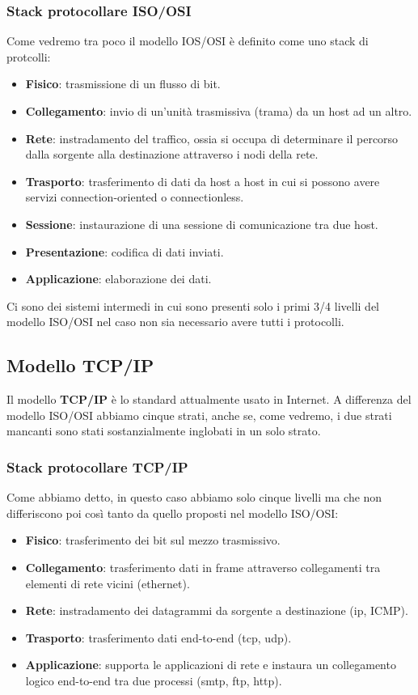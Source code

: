 \subsubsection{Stack protocollare ISO/OSI}
Come vedremo tra poco il modello IOS/OSI è definito come uno stack di protcolli:
\begin{itemize}
	\item \textbf{Fisico}: trasmissione di un flusso di bit.
	\item \textbf{Collegamento}: invio di un'unità trasmissiva (trama) da un host ad un altro.
	\item \textbf{Rete}: instradamento del traffico, ossia si occupa di determinare il percorso 
		dalla sorgente alla destinazione attraverso i nodi della rete.
	\item \textbf{Trasporto}: trasferimento di dati da host a host in cui si possono avere servizi
		connection-oriented o connectionless.
	\item \textbf{Sessione}: instaurazione di una sessione di comunicazione tra due host.
	\item \textbf{Presentazione}: codifica di dati inviati.
	\item \textbf{Applicazione}: elaborazione dei dati.
\end{itemize}
Ci sono dei sistemi intermedi in cui sono presenti solo i primi 3/4 livelli del modello ISO/OSI
nel caso non sia necessario avere tutti i protocolli.

\subsection{Modello TCP/IP}
Il modello \textbf{TCP/IP} è lo standard attualmente usato in Internet. A differenza del modello 
ISO/OSI abbiamo cinque strati, anche se, come vedremo, i due strati mancanti sono stati
sostanzialmente inglobati in un solo strato.

\subsubsection{Stack protocollare TCP/IP}
Come abbiamo detto, in questo caso abbiamo solo cinque livelli ma che non differiscono poi così 
tanto da quello proposti nel modello ISO/OSI:
\begin{itemize}
	\item \textbf{Fisico}: trasferimento dei bit sul mezzo trasmissivo.
	\item \textbf{Collegamento}: trasferimento dati in frame attraverso collegamenti tra elementi
		di rete vicini (ethernet).
	\item \textbf{Rete}: instradamento dei datagrammi da sorgente a destinazione (ip, ICMP).
	\item \textbf{Trasporto}: trasferimento dati end-to-end (tcp, udp).
	\item \textbf{Applicazione}: supporta le applicazioni di rete e instaura un collegamento
		logico end-to-end tra due processi (smtp, ftp, http).
\end{itemize}
